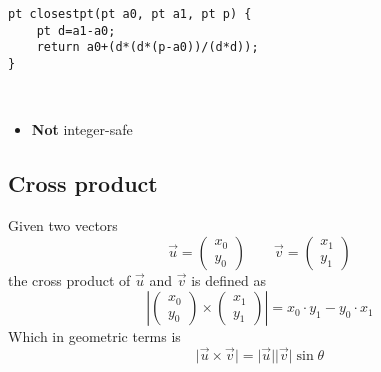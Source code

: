 \documentclass[12pt,t]{beamer}
\newcommand{\bi}{\begin{itemize}}
\newcommand{\ei}{\end{itemize}}
\begin{document}
\begin{frame}[fragile]
  \vspace{20pt}
  \begin{verbatim}
pt closestpt(pt a0, pt a1, pt p) {
    pt d=a1-a0;
    return a0+(d*(d*(p-a0))/(d*d));
}
  \end{verbatim} 
  \ \\ \pause
  \bi
 	\item \textbf{Not} integer-safe
  \ei
\end{frame}
\subsection{Cross product}
\begin{frame}
  \vspace{20pt}
  Given two vectors
  \[
    \vec{u} = \begin{pmatrix} x_0 \\ y_0 \end{pmatrix} \quad\quad
    \vec{v} = \begin{pmatrix} x_1 \\ y_1 \end{pmatrix}
  \]
  the cross product of $\vec{u}$ and $\vec{v}$ is defined as 
  \[
    \left\lvert \begin{pmatrix} x_0 \\ y_0 \end{pmatrix} \times
    \begin{pmatrix} x_1 \\ y_1 \end{pmatrix}\right\rvert  = 
    x_0\cdot y_1 - y_0 \cdot x_1
  \]
  Which in geometric terms is
  \[
    \lvert \vec{u} \times \vec{v} \vert = 
    \lvert \vec{u} \rvert \lvert \vec{v} \rvert \sin \theta
  \]
\end{frame}
\end{document}
